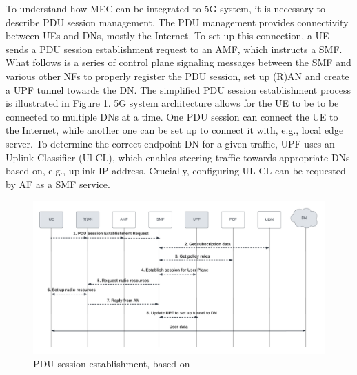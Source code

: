 \documentclass[12pt,a4paper,twoside]{report}
\begin{document}
To understand how MEC can be integrated to 5G system, it is necessary to describe PDU session management. The PDU management provides connectivity between UEs and DNs, mostly the Internet. To set up this connection, a UE sends a PDU session establishment request to an AMF, which instructs a SMF. What follows is a series of control plane signaling messages between the SMF and various other NFs to properly register the PDU session, set up (R)AN and create a UPF tunnel towards the DN. The simplified PDU session establishment process is illustrated in Figure \ref{F:PDU-est}. 5G system architecture allows for the UE to be to be connected to multiple DNs at a time. One PDU session can connect the UE to the Internet, while another one can be set up to connect it with, e.g., local edge server. To determine the correct endpoint DN for a given traffic, UPF uses an Uplink Classifier (Ul CL), which enables steering traffic towards appropriate DNs based on, e.g., uplink IP address. Crucially, configuring UL CL can be requested by AF as a SMF service. \cite{rommer20195g}

\begin{figure}[ht]
	\centering
	\includegraphics[width=\textwidth]{./images/PDU-sesh-est.png}
	\caption{PDU session establishment, based on \cite{rommer20195g}}
	\label{F:PDU-est}
\end{figure}
\end{document}
